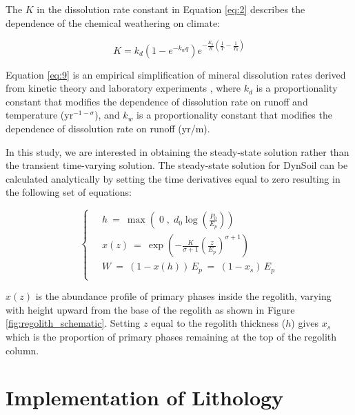 \documentclass[11pt,letterpaper]{article}
\begin{document}
The $K$ in the dissolution rate constant in Equation \ref{eq:2} describes the dependence of the chemical weathering on climate:

\begin{equation}
    K = k_{d}\left(1-e^{-k_{w}q}\right)e^{-\frac{E_{a}}{R}\left(\frac{1}{T}-\frac{1}{T_{0}}\right)}
    \label{eq:9}
\end{equation}

\noindent
Equation \ref{eq:9} is an empirical simplification of mineral dissolution rates derived from kinetic theory and laboratory experiments \citep{West2012a}, where $k_{d}$ is a proportionality constant that modifies the dependence of dissolution rate on runoff and temperature (yr$^{-1-\sigma}$), and $k_{w}$ is a proportionality constant that modifies the dependence of dissolution rate on runoff (yr/m).

In this study, we are interested in obtaining the steady-state solution rather than the transient time-varying solution. The steady-state solution for DynSoil can be calculated analytically by setting the time derivatives equal to zero resulting in the following set of equations:

\begin{equation}\label{eq:dynsoil_ss}
\left\{\ 
\begin{aligned}
& h   \ =\    \max\left(  \;  0  \;,\;  d_{0} \log\left(\frac{P_{0}}{E_{p}}\right)  \right)                                                 \\
& x(z)      \ =\   \exp\left(   - \frac{K}{\sigma+1}  \left(\frac{z}{E_{p}}\right)^{\sigma+1}   \right)   \\
& W        \ =\   (1-x(h)) \, E_{p}  \ =\   (1-x_s) \, E_{p}                                                                         \\
\end{aligned}
\right.
\end{equation}

\noindent
$x(z)$ is the abundance profile of primary phases inside the regolith, varying with height upward from the base of the regolith as shown in Figure \ref{fig:regolith_schematic}. Setting $z$ equal to the regolith thickness ($h$) gives $x_s$ which is the proportion of primary phases remaining at the top of the regolith column.

\section*{Implementation of Lithology}
\end{document}
